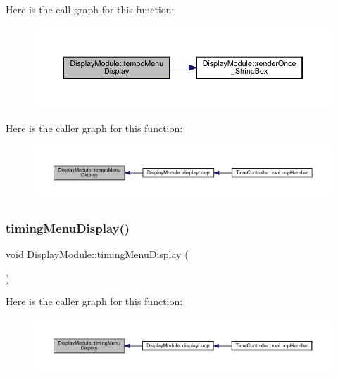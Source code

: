Here is the call graph for this function\+:
\nopagebreak
\begin{figure}[H]
\begin{center}
\leavevmode
\includegraphics[width=350pt]{class_display_module_ac5999c2f0f4b1ecc12bafe7094c7b7d2_cgraph}
\end{center}
\end{figure}
Here is the caller graph for this function\+:
\nopagebreak
\begin{figure}[H]
\begin{center}
\leavevmode
\includegraphics[width=350pt]{class_display_module_ac5999c2f0f4b1ecc12bafe7094c7b7d2_icgraph}
\end{center}
\end{figure}
\mbox{\label{class_display_module_a722a8c3b1cce1c58fa7e17e2865c3e57}} 
\subsubsection{\texorpdfstring{timing\+Menu\+Display()}{timingMenuDisplay()}}
{\footnotesize\ttfamily void Display\+Module\+::timing\+Menu\+Display (\begin{DoxyParamCaption}{ }\end{DoxyParamCaption})}

Here is the caller graph for this function\+:
\nopagebreak
\begin{figure}[H]
\begin{center}
\leavevmode
\includegraphics[width=350pt]{class_display_module_a722a8c3b1cce1c58fa7e17e2865c3e57_icgraph}
\end{center}
\end{figure}


